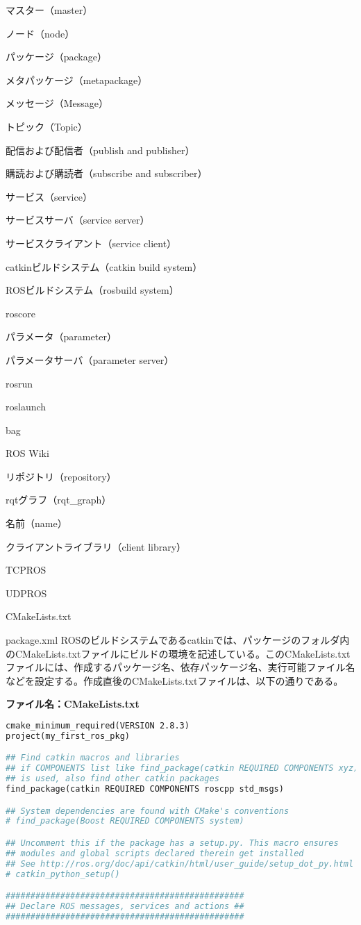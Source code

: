\begin{term}{マスター（master）}
\begin{term}{ノード（node）}
\begin{term}{パッケージ（package）}
\begin{term}{メタパッケージ（metapackage）}
\begin{term}{メッセージ（Message）}
\begin{term}{トピック（Topic）}
\begin{term}{配信および配信者（publish and publisher）}
\begin{term}{購読および購読者（subscribe and subscriber）}
\begin{term}{サービス（service）}
\begin{term}{サービスサーバ（service server）}
\begin{term}{サービスクライアント（service client）}
\begin{term}{catkinビルドシステム（catkin build system）}
\begin{term}{ROSビルドシステム（rosbuild system）}
\begin{term}{roscore}
\begin{term}{パラメータ（parameter）}
\begin{term}{パラメータサーバ（parameter server）}
\begin{term}{rosrun}
\begin{term}{roslaunch}
\begin{term}{bag}
\begin{term}{ROS Wiki}
\begin{term}{リポジトリ（repository）}
\begin{term}{rqtグラフ（rqt\_graph）}
\begin{term}{名前（name）}
\begin{term}{クライアントライブラリ（client library）}
\begin{term}{TCPROS}
\begin{term}{UDPROS}
\begin{term}{CMakeLists.txt}
\begin{term}{package.xml}
ROSのビルドシステムであるcatkinでは、パッケージのフォルダ内のCMakeLists.txtファイルにビルドの環境を記述している。このCMakeLists.txtファイルには、作成するパッケージ名、依存パッケージ名、実行可能ファイル名などを設定する。作成直後のCMakeLists.txtファイルは、以下の通りである。

\noindent\textbf{ファイル名：CMakeLists.txt}

\begin{lstlisting}[language=make]
cmake_minimum_required(VERSION 2.8.3)
project(my_first_ros_pkg)

## Find catkin macros and libraries
## if COMPONENTS list like find_package(catkin REQUIRED COMPONENTS xyz)
## is used, also find other catkin packages
find_package(catkin REQUIRED COMPONENTS roscpp std_msgs)

## System dependencies are found with CMake's conventions
# find_package(Boost REQUIRED COMPONENTS system)

## Uncomment this if the package has a setup.py. This macro ensures
## modules and global scripts declared therein get installed
## See http://ros.org/doc/api/catkin/html/user_guide/setup_dot_py.html
# catkin_python_setup()

################################################
## Declare ROS messages, services and actions ##
################################################


\end{lstlisting}
\end{term}
\end{term}
\end{term}
\end{term}
\end{term}
\end{term}
\end{term}
\end{term}
\end{term}
\end{term}
\end{term}
\end{term}
\end{term}
\end{term}
\end{term}
\end{term}
\end{term}
\end{term}
\end{term}
\end{term}
\end{term}
\end{term}
\end{term}
\end{term}
\end{term}
\end{term}
\end{term}
\end{term}
